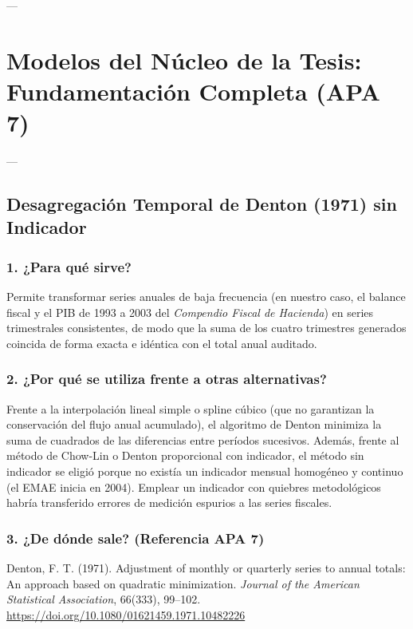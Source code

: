 \documentclass[11pt,a4paper]{article}
\begin{document}
---

\section{Modelos del Núcleo de la Tesis: Fundamentación Completa (APA 7)}

---

\subsection{Desagregación Temporal de Denton (1971) sin Indicador}

\subsubsection{1. ¿Para qué sirve?}
Permite transformar series anuales de baja frecuencia (en nuestro caso, el balance fiscal y el PIB de 1993 a 2003 del \textit{Compendio Fiscal de Hacienda}) en series trimestrales consistentes, de modo que la suma de los cuatro trimestres generados coincida de forma exacta e idéntica con el total anual auditado.

\subsubsection{2. ¿Por qué se utiliza frente a otras alternativas?}
Frente a la interpolación lineal simple o spline cúbico (que no garantizan la conservación del flujo anual acumulado), el algoritmo de Denton minimiza la suma de cuadrados de las diferencias entre períodos sucesivos. Además, frente al método de Chow-Lin o Denton proporcional con indicador, el método sin indicador se eligió porque no existía un indicador mensual homogéneo y continuo (el EMAE inicia en 2004). Emplear un indicador con quiebres metodológicos habría transferido errores de medición espurios a las series fiscales.

\subsubsection{3. ¿De dónde sale? (Referencia APA 7)}
\begin{mdframed}[style=apabox]
Denton, F. T. (1971). Adjustment of monthly or quarterly series to annual totals: An approach based on quadratic minimization. \textit{Journal of the American Statistical Association}, 66(333), 99--102. \url{https://doi.org/10.1080/01621459.1971.10482226}
\end{mdframed}
\end{document}
